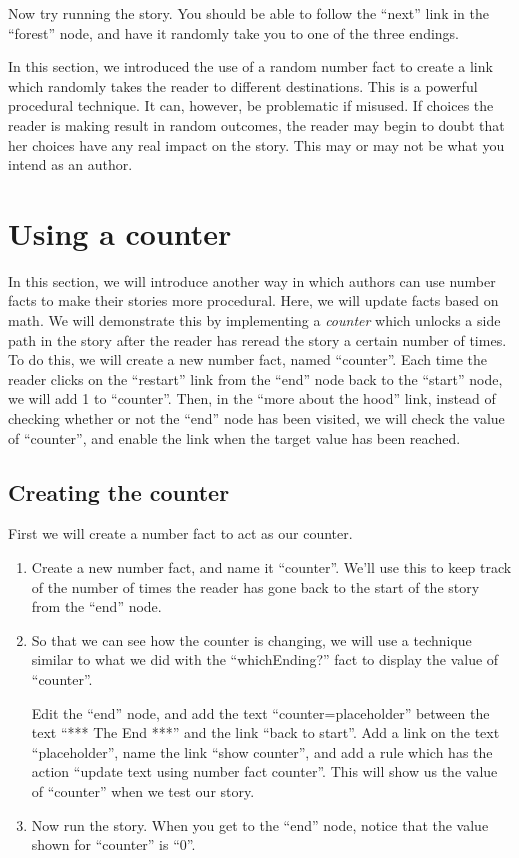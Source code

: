\documentclass{article}
\begin{document}
Now try running the story. You should be able to follow the ``next'' 
link in the ``forest'' node, and have it randomly take you to one of 
the three endings.

In this section, we introduced the use of a random number fact to 
create a link which randomly takes the reader to different 
destinations. This is a powerful procedural technique. It can, 
however, be problematic if misused. If choices the reader is making 
result in random outcomes, the reader may begin to doubt that her 
choices have any real impact on the story. This may or may not be 
what you intend as an author.

\section{Using a counter}

In this section, we will introduce another way in which authors can 
use number facts to make their stories more procedural. Here, we will 
update facts based on math. We will demonstrate this by implementing 
a \textit{counter} which unlocks a side path in the story after the 
reader has reread the story a certain number of times. To do this, we 
will create a new number fact, named ``counter''. Each time the 
reader clicks on the ``restart'' link from the ``end'' node back to 
the ``start'' node, we will add 1 to ``counter''. Then, in the ``more 
about the hood'' link, instead of checking whether or not the ``end'' 
node has been visited, we will check the value of ``counter'', and 
enable the link when the target value has been reached.

\subsection{Creating the counter}

First we will create a number fact to act as our counter.

\begin{enumerate}
    \item Create a new number fact, and name it ``counter''. We'll 
    use this to keep track of the number of times the reader has gone 
    back to the start of the story from the ``end'' node.
    \item So that we can see how the counter is changing, we will use 
    a technique similar to what we did with the ``whichEnding?'' fact 
    to display the value of ``counter''.
    
    Edit the ``end'' node, and add the text ``counter=placeholder'' 
    between the text ``*** The End ***'' and the link ``back to 
    start''. Add a link on the text ``placeholder'', name the link 
    ``show counter'', and add a rule which has the action ``update 
    text using number fact counter''. This will show us the value of 
    ``counter'' when we test our story.
\item Now run the story. When you get to the ``end'' node, notice that the 
value shown for ``counter'' is ``0''. 
\end{enumerate}
\end{document}
